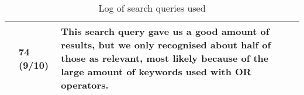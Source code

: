 \begin{table}[H]
\begin{adjustwidth}{-1.3cm}{-1.3cm}
\begin{tabular}{P{12mm}|P{106mm}|P{12mm}|P{26mm}}
            & 74 (9/10)
            & This search query gave us a good amount of results, but we only recognised about half of those as relevant, most likely because of the large amount of keywords used with OR operators.
            \\
            \bottomrule
      \end{tabular}
\caption{Log of search queries used}
\label{tab:log}
\end{adjustwidth}
\end{table}

